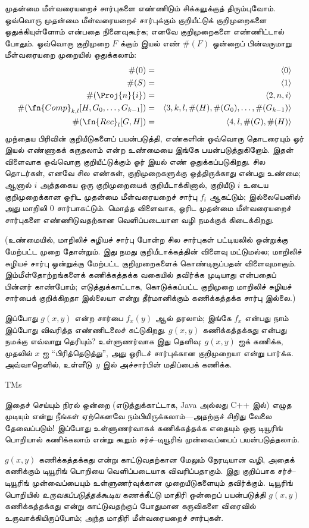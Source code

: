 \documentclass[../../../include/open-logic-section]{subfiles}
\begin{document}
முதன்மை மீள்வரையறைச் சார்புகளை எண்ணிடும் சிக்கலுக்குத் திரும்புவோம்.
ஒவ்வொரு முதன்மை மீள்வரையறைச் சார்புக்கும் குறியீட்டுக் குறிமுறைகளை
ஒதுக்கியுள்ளோம் என்பதை நினைவுகூர்க; எனவே குறிமுறைகளை எண்ணிட்டால்
போதும். ஒவ்வொரு குறிமுறை $F$ க்கும் இயல் எண் $\#(F)$ ஒன்றைப்
பின்வருமாறு மீள்வரையறை முறையில் ஒதுக்கலாம்:
\begin{eqnarray*}
\#(0) & = & \langle 0 \rangle \\
\#(S) & = & \langle 1 \rangle \\
\#(\Proj{n}{i}) & = & \langle 2, n, i \rangle \\
\#(\fn{Comp}_{k,l}[H,G_0,\dots,G_{k-1}]) & = & \langle
3,k,l,\#(H),\#(G_0),\dots,\#(G_{k-1}) \rangle \\
\#(\fn{Rec}_l[G,H]) & = & \langle 4, l, \#(G), \#(H) \rangle
\end{eqnarray*}
முந்தைய பிரிவின் குறியீடுகளைப் பயன்படுத்தி, எண்களின் ஒவ்வொரு தொடரையும்
ஓர் இயல் எண்ணாகக் கருதலாம் என்ற உண்மையை இங்கே பயன்படுத்துகிறோம்.
இதன் விளைவாக ஒவ்வொரு குறியீட்டுக்கும் ஓர் இயல் எண் ஒதுக்கப்படுகிறது.
சில தொடர்கள், எனவே சில எண்கள், குறிமுறைகளுக்கு ஒத்திருக்காது என்பது
உண்மை; ஆனால் $i$ அத்தகைய ஒரு குறிமுறையைக் குறியீடாக்கினால்,
குறியீடு $i$ உடைய குறிமுறைக்கான ஓரிட முதன்மை மீள்வரையறைச் சார்பு
$f_i$ ஆகட்டும்; இல்லையெனில் அது மாறிலி $0$ சார்பாகட்டும்.
மொத்த விளைவாக, ஓரிட முதன்மை மீள்வரையறைச் சார்புகளை எண்ணிடுவதற்கான
வெளிப்படையான வழி நமக்குக் கிடைக்கிறது.

(உண்மையில், மாறிலிச் சுழியச் சார்பு போன்ற சில சார்புகள் பட்டியலில்
ஒன்றுக்கு மேற்பட்ட முறை தோன்றும். இது நமது குறியீடாக்கத்தின்
விளைவு மட்டுமல்ல; மாறிலிச் சுழியச் சார்பு ஒன்றுக்கு மேற்பட்ட
குறிமுறைகளைக் கொண்டிருப்பதன் விளைவுமாகும். இம்மீள்தோற்றங்களைக்
கணிக்கத்தக்க வகையில் தவிர்க்க முடியாது என்பதைப் பின்னர் காண்போம்;
எடுத்துக்காட்டாக, கொடுக்கப்பட்ட குறிமுறை மாறிலிச் சுழியச் சார்பைக்
குறிக்கிறதா இல்லையா என்று தீர்மானிக்கும் கணிக்கத்தக்க சார்பு இல்லை.)

இப்போது $g(x,y)$ என்ற சார்பை $f_x(y)$ ஆல் தரலாம்; இங்கே $f_x$
என்பது நாம் இப்போது விவரித்த எண்ணிடலைச் சுட்டுகிறது. $g(x,y)$
கணிக்கத்தக்கது என்பது நமக்கு எவ்வாறு தெரியும்? உள்ளுணர்வாக இது
தெளிவு: $g(x,y)$ ஐக் கணிக்க, முதலில் $x$ ஐ “பிரித்தெடுத்து”,
அது ஓரிடச் சார்புக்கான குறிமுறையா என்று பார்க்க. அவ்வாறெனில்,
உள்ளீடு~$y$ இல் அச்சார்பின் மதிப்பைக் கணிக்க.

\begin{tagblock}{TMs}
\begin{digress}
இதைச் செய்யும் நிரல் ஒன்றை (எடுத்துக்காட்டாக, Java அல்லது C++ இல்)
எழுத முடியும் என்று நீங்கள் ஏற்கெனவே நம்பியிருக்கலாம்---அதற்குச்
சிறிது வேலை தேவைப்படும்! இப்போது உள்ளுணர்வாகக் கணிக்கத்தக்க எதையும்
ஒரு டியூரிங் பொறியால் கணிக்கலாம் என்று கூறும் சர்ச்--டியூரிங்
முன்வைப்பைப் பயன்படுத்தலாம்.

$g(x,y)$ கணிக்கத்தக்கது என்று காட்டுவதற்கான மேலும் நேரடியான வழி,
அதைக் கணிக்கும் டியூரிங் பொறியை வெளிப்படையாக விவரிப்பதாகும்.
இது குறிப்பாக சர்ச்--டியூரிங் முன்வைப்பையும் உள்ளுணர்வுக்கான
முறையீடுகளையும் தவிர்க்கும். டியூரிங் பொறியில்
\emph{உருவகப்படுத்தக்கூடிய} கணக்கீட்டு மாதிரி ஒன்றைப் பயன்படுத்தி
$g(x,y)$ கணிக்கத்தக்கது என்று காட்டுவதற்குப் போதுமான கருவிகளை விரைவில்
உருவாக்கியிருப்போம்; அந்த மாதிரி மீள்வரையறைச் சார்புகள்.
\end{digress}
\end{tagblock}
\end{document}
